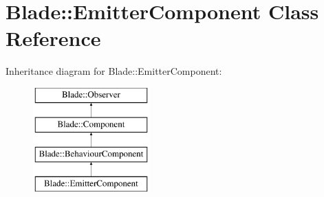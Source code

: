 \hypertarget{class_blade_1_1_emitter_component}{}\section{Blade\+:\+:Emitter\+Component Class Reference}
\label{class_blade_1_1_emitter_component}
Inheritance diagram for Blade\+:\+:Emitter\+Component\+:\begin{figure}[H]
\begin{center}
\leavevmode
\includegraphics[height=4.000000cm]{class_blade_1_1_emitter_component}
\end{center}
\end{figure}
